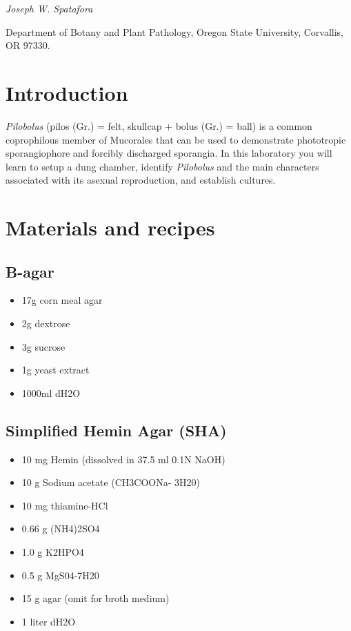 \documentclass[]{book}
\providecommand{\tightlist}{%
  \setlength{\itemsep}{0pt}\setlength{\parskip}{0pt}}
\begin{document}
\emph{Joseph W. Spatafora}

Department of Botany and Plant Pathology, Oregon State University, Corvallis, OR 97330.

\hypertarget{introduction-6}{%
\section{Introduction}\label{introduction-6}}

\emph{Pilobolus }(pilos (Gr.) = felt, skullcap + bolus (Gr.) = ball) is a common coprophilous member of Mucorales that can be used to demonstrate phototropic sporangiophore and forcibly discharged sporangia. In this laboratory you will learn to setup a dung chamber, identify \emph{Pilobolus} and the main characters associated with its asexual reproduction, and establish cultures.

\hypertarget{materials-and-recipes}{%
\section{Materials and recipes}\label{materials-and-recipes}}

\hypertarget{b-agar}{%
\subsection{\texorpdfstring{{B-agar}}{B-agar}}\label{b-agar}}

\begin{itemize}
\tightlist
\item
  17g corn meal agar
\item
  2g dextrose
\item
  3g sucrose
\item
  1g yeast extract
\item
  1000ml dH2O
\end{itemize}

\hypertarget{simplified-hemin-agar-sha}{%
\subsection{\texorpdfstring{{Simplified Hemin Agar (SHA)}}{Simplified Hemin Agar (SHA)}}\label{simplified-hemin-agar-sha}}

\begin{itemize}
\tightlist
\item
  10 mg Hemin (dissolved in 37.5 ml 0.1N NaOH)
\item
  10 g Sodium acetate (CH3COONa- 3H20)
\item
  10 mg thiamine-HCl
\item
  0.66 g (NH4)2SO4
\item
  1.0 g K2HPO4
\item
  0.5 g MgS04-7H20
\item
  15 g agar (omit for broth medium)
\item
  1 liter dH2O
\end{itemize}
\end{document}
